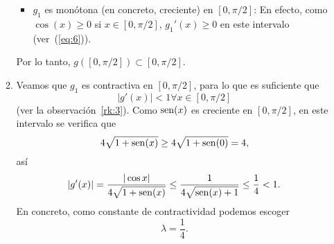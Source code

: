 \begin{example}
\begin{itemize}
\begin{enumerate}
\begin{itemize}
      \item $g_1$ es monótona (en concreto, creciente) en $[0,\pi/2]$:
        En efecto, como $\cos(x)\ge 0$ si $x\in
        [0, \pi/2]$, $g_1'(x)\ge 0$ en este intervalo (ver~(\ref{eq:6})).
      \end{itemize}
      Por lo tanto,
      $g([0, \pi/2]) \subset [0, \pi/2]$.
    \item Veamos que $g_1$ es contractiva en $[0,\pi/2]$, para lo que
      es suficiente que
      $$|g'(x)|<1 \forall x\in [0, \pi/2]$$
      (ver la
      observación~\ref{rk:3}). Como $\operatorname{sen}(x)$ es creciente en
      $[0, \pi/2]$, en este intervalo se verifica que
      $$4\sqrt{1+\operatorname{sen}(x)}\ge 4\sqrt{1+\operatorname{sen}(0)}=4,$$
      así
      $$
      \left|g'(x)\right| = \frac{|\cos{x}|}{4\sqrt{1+\operatorname{sen}(x)}} \le
      \frac{1}{4\sqrt{\operatorname{sen}(x)+1}} \le \frac 1 4 < 1.
      $$
      En concreto, como constante de contractividad podemos escoger
      $$\lambda=\frac 1 4.$$
    \end{enumerate}

\end{itemize}
\end{example}
